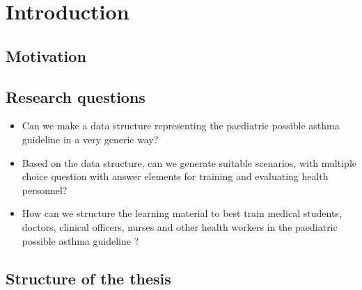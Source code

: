 \chapter{Introduction}
\section{Motivation}
\section{Research questions}
\begin{itemize}
	\item Can we make a data structure representing the paediatric possible asthma guideline \cite{RepublicofKeny2016}  in a very generic way?
	\item Based on the data structure, can we generate suitable scenarios, with multiple choice question with answer elements for training and evaluating health personnel?
	\item How can we structure the learning material to best train medical students, doctors, clinical officers, nurses and other health workers in the paediatric possible asthma guideline \cite{RepublicofKeny2016}? 
\end{itemize}
\section{Structure of the thesis}